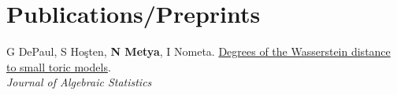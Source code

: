 %
%
%


\section{Publications/Preprints}





\begin{etaremune}[leftmargin=13pt]
\item {\color{grey}G DePaul, S Ho\c{s}ten, \textbf{N Metya}, I Nometa}. \href{https://arxiv.org/abs/2402.09626}{Degrees of the Wasserstein distance to small toric models}. \\
\textit{Journal of Algebraic Statistics}
\end{etaremune}



